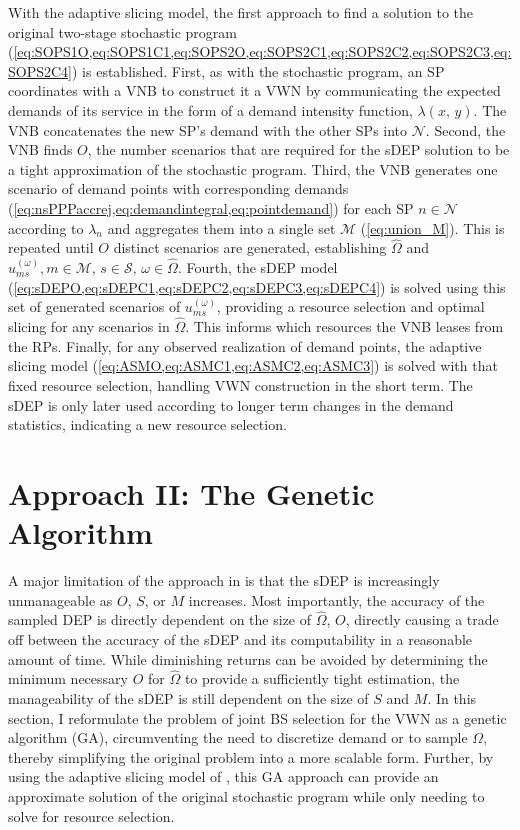 \documentclass[12pt,dvipsnames]{report}
\begin{document}
With the adaptive slicing model, the first approach to find a solution to the original two-stage stochastic program (\cref{eq:SOPS1O,eq:SOPS1C1,eq:SOPS2O,eq:SOPS2C1,eq:SOPS2C2,eq:SOPS2C3,eq:SOPS2C4}) is established.  First, as with the stochastic program, an SP coordinates with a VNB to construct it a VWN by communicating the expected demands of its service in the form of a demand intensity function, $\lambda \left( x,\, y \right)$.  The VNB concatenates the new SP's demand with the other SPs into $\mathcal{N}$.  Second, the VNB finds $O$, the number scenarios that are required for the sDEP solution to be a tight approximation of the stochastic program.  Third, the VNB generates one scenario of demand points with corresponding demands (\cref{eq:nsPPPaccrej,eq:demandintegral,eq:pointdemand}) for each SP $n \in \mathcal{N}$ according to $\lambda_n$ and aggregates them into a single set $\mathcal{M}$ (\cref{eq:union_M}).  This is repeated until $O$ distinct scenarios are generated, establishing $\hat{\Omega}$ and $u_{ms}^{\left( \omega \right)}, m \in \mathcal{M},\, s \in \mathcal{S},\, \omega \in \hat{\Omega}$.  Fourth, the sDEP model (\cref{eq:sDEPO,eq:sDEPC1,eq:sDEPC2,eq:sDEPC3,eq:sDEPC4}) is solved using this set of generated scenarios of $u_{ms}^{\left( \omega \right)}$, providing a resource selection and optimal slicing for any scenarios in $\hat{\Omega}$.  This informs which resources the VNB leases from the RPs.  Finally, for any observed realization of demand points, the adaptive slicing model (\cref{eq:ASMO,eq:ASMC1,eq:ASMC2,eq:ASMC3}) is solved with that fixed resource selection, handling VWN construction in the short term.  The sDEP is only later used according to longer term changes in the demand statistics, indicating a new resource selection.

\section{Approach II: The Genetic Algorithm} \label{sec:ga}

A major limitation of the approach in  is that the sDEP is increasingly unmanageable as $O$, $S$, or $M$ increases.  Most importantly, the accuracy of the sampled DEP is directly dependent on the size of $\hat{\Omega}$, $O$, directly causing a trade off between the accuracy of the sDEP and its computability in a reasonable amount of time.  While diminishing returns can be avoided by determining the minimum necessary $O$ for $\hat{\Omega}$ to provide a sufficiently tight estimation, the manageability of the sDEP is still dependent on the size of $S$ and $M$.  In this section, I reformulate the problem of joint BS selection for the VWN as a genetic algorithm (GA), circumventing the need to discretize demand or to sample $\Omega$, thereby simplifying the original problem into a more scalable form.  Further, by using the adaptive slicing model of , this GA approach can provide an approximate solution of the original stochastic program while only needing to solve for resource selection.
\end{document}
